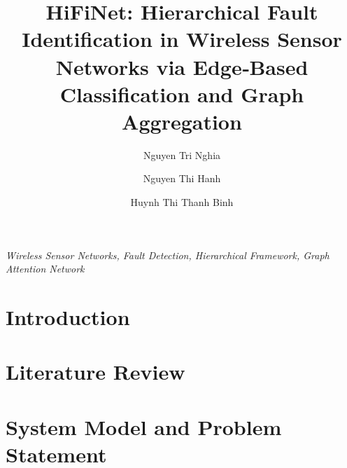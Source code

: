 \documentclass[preprint,12pt]{elsarticle}
\begin{document}
\begin{frontmatter}

\title{HiFiNet: Hierarchical Fault Identification in Wireless Sensor Networks via Edge‑Based Classification and Graph Aggregation}

\author[hust]{Nguyen Tri Nghia}
\author[pnk]{Nguyen Thi Hanh}
\author[hust]{Huynh Thi Thanh Binh}
\address[hust]{Hanoi University of Science and Technology, Vietnam}
\address[pnk]{Faculty of Interdisciplinary Digital Technology (FIDT), PHENIKAA University, Vietnam}



\begin{keyword}
\textit{Wireless Sensor Networks, Fault Detection, Hierarchical Framework, Graph Attention Network}
\end{keyword}

\end{frontmatter}

\section{Introduction}


\section{Literature Review}


\section{System Model and Problem Statement}



\end{document}
